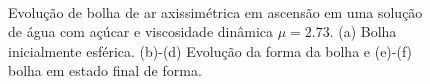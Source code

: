 \documentclass[a4paper,portuges,12pt]{article}
\begin{document}
\begin{figure}[h]
\begin{center}
 		\\
 		\hspace{0.7cm}
 		\hspace{0.7cm}
 	\end{center}
	\caption{Evolução de bolha de ar axissimétrica em ascensão em uma
	solução de água com açúcar e viscosidade dinâmica $\mu=2.73$. (a)
	Bolha inicialmente esférica. (b)-(d) Evolução da forma da bolha e
	(e)-(f) bolha em estado final de forma.} 
	\label{fig:micro1} 
 \end{figure}
\end{document}
